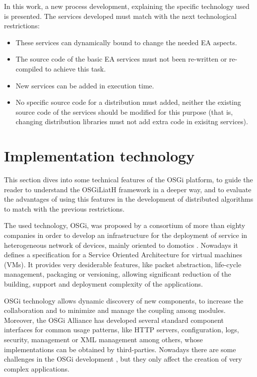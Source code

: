 \documentclass{sig-alternate}
\begin{document}
In this work, a new process development, explaining the specific technology used is presented. The services developed must match with the next technological restrictions:
\begin{itemize}
\item These services can dynamically bound to cha\-nge the needed EA aspects. 
\item The source code of  the basic EA services must not been re-written or re-compiled to achieve this task. 
\item New services can be added in execution time. 
\item No specific source code for a distribution must added, neither the existing source code of the services should be modified for this purpose (that is, changing distribution libraries must not add extra code in exisitng services).
\end{itemize}


\section{Implementation technology}
\label{sec:technology}
This section dives into some technical features of the OSGi platform, to guide the reader to understand the OSGiLiatH framework in a deeper way, and to evaluate the advantages of using this features in the development of distributed algorithms to match with the previous restrictions.

The used technology, OSGi, was proposed by a consortium of more than
eighty companies in order to develop an infrastructure for the
deployment of service in heterogeneous network of devices, mainly
oriented to domotics \cite{GATEWAY}. Nowadays it defines a
specification for a Service Oriented Architecture for virtual
machines (VMs). It provides very desiderable features, like
packet abstraction, life-cycle management, packaging or versioning,
allowing significant reduction of the building, support and deployment
complexity of the applications. 

OSGi technology allows dynamic discovery of new components, to increase the collaboration and to minimize and manage the coupling
among modules. Moreover, the
OSGi Alliance has developed several standard component interfaces for
common usage patterns, like HTTP servers, configuration, logs, security,
management or XML management among others, whose implementations can
be obtained by third-parties. Nowadays there are some challenges 
in the OSGi development \cite{OSGICHALLENGES}, but they only affect the creation of very complex applications.
\end{document}
